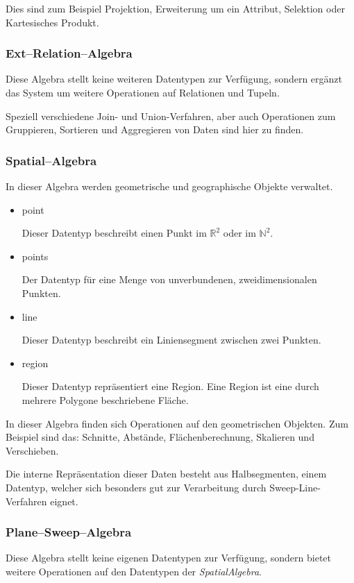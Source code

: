 Dies sind zum Beispiel Projektion, Erweiterung um ein Attribut, Selektion oder Kartesisches Produkt.

\subsubsection{Ext--Relation--Algebra}

Diese Algebra stellt keine weiteren Datentypen zur Verfügung, sondern ergänzt das System um weitere Operationen auf Relationen und Tupeln. 

Speziell verschiedene Join- und Union-Verfahren, aber auch Operationen zum Gruppieren, Sortieren und Aggregieren von Daten sind hier zu finden.

\subsubsection{Spatial--Algebra}
In dieser Algebra werden geometrische und geographische Objekte verwaltet.
\begin{itemize}
\item point

Dieser Datentyp beschreibt einen Punkt im $\mathbb{R}^2$ oder im $\mathbb{N}^2$.
\item points

Der Datentyp für eine Menge von unverbundenen, zweidimensionalen Punkten. 
\item line

Dieser Datentyp beschreibt ein Liniensegment zwischen zwei Punkten.
\item region

Dieser Datentyp repräsentiert eine Region. Eine Region ist eine durch mehrere Polygone beschriebene Fläche.
\end{itemize}

In dieser Algebra finden sich Operationen auf den geometrischen Objekten. Zum Beispiel sind das:
 Schnitte, Abstände, Flächenberechnung, Skalieren und Verschieben.
 
Die interne Repräsentation dieser Daten besteht aus Halbsegmenten, einem Datentyp, welcher sich besonders gut zur Verarbeitung durch Sweep-Line-Verfahren eignet.

\subsubsection{Plane--Sweep--Algebra}

Diese Algebra stellt keine eigenen Datentypen zur Verfügung, sondern bietet weitere Operationen auf den Datentypen der \textit{SpatialAlgebra}.

